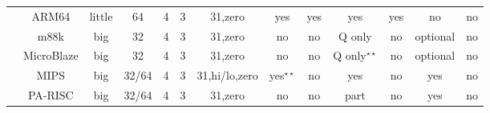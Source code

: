 \begin{sidewaystable}[tbp]
\begin{sf}
\begin{footnotesize}
\begin{center}
\begin{tabular}{|c|c||c|c|c|c|c|c|c|c|c|c|c|}
                 & %
ARM64            & %
little           & %
64               & %
4                & %
3                & %
31,zero          & %
yes              & %
yes              & %
yes              & %
yes              & %
no               & %
no                %
\\
\cline{2-13}


		 & %
m88k             & %
big              & %
32               & %
4                & %
3                & %
31,zero          & %
no               & %
no               & %
Q only           & %
no               & %
optional         & %
no                 %
\\
\cline{2-13}

		 & %
MicroBlaze       & %
big              & %
32               & %
4                & %
3                & %
31,zero          & %
no               & %
no               & %
Q only$^{\star\star}$ & %
no               & %
optional         & %
no                 %
\\
\cline{2-13}

		 & %
MIPS             & %
big              & %
32/64            & %
4                & %
3                & %
31,hi/lo,zero    & %
yes$^{\star\star}$& %
no               & %
yes              & %
no               & %
yes              & %
no                 %
\\
\cline{2-13}

                 & %
PA-RISC          & %
big              & %
32/64            & %
4                & %
3                & %
31,zero          & %
no               & %
no               & %
part             & %
no               & %
yes              & %
no                 %
\\
\cline{2-13}


\end{tabular}
\end{center}
\end{footnotesize}
\end{sf}
\end{sidewaystable}
